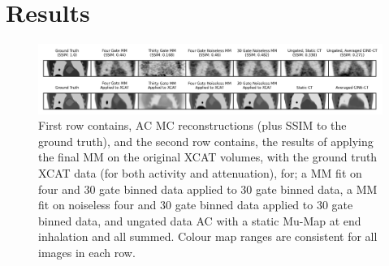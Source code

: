 \section{Results} \label{sec:results}
    \begin{figure}
        
        \centering
        
        \includegraphics[width=1.0\linewidth]{figures/visual_analysis.png}
        
        
        \captionsetup{singlelinecheck=false, justification=centering}
        \caption{
        First row contains, \gls{AC} \gls{MC} reconstructions (plus \acrshort{SSIM} to the ground truth), and the second row contains, the results of applying the final \gls{MM} on the original \acrshort{XCAT} volumes, with the ground truth \acrshort{XCAT} data (for both activity and attenuation), for; a \gls{MM} fit on four and $30$ gate binned data applied to $30$ gate binned data, a \gls{MM} fit on noiseless four and $30$ gate binned data applied to $30$ gate binned data, and ungated data \gls{AC} with a static \gls{Mu-Map} at end inhalation and all  summed. Colour map ranges are consistent for all images in each row.}
        
        \label{fig:visual_analysis}
        
    \end{figure}
    
